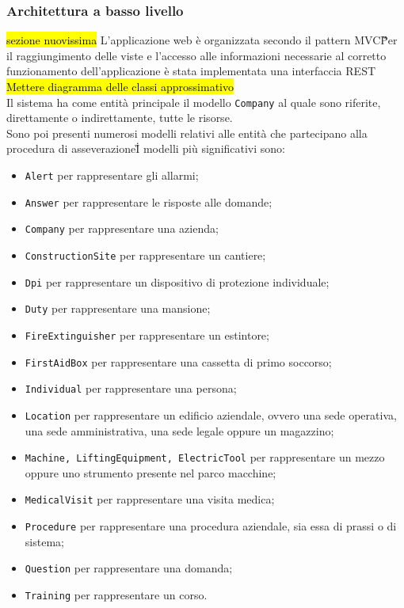 \subsubsection{Architettura a basso livello}
\hl{sezione nuovissima}
L'applicazione web è organizzata secondo il pattern \gls{MVC}\G\. Per il raggiungimento delle viste e l'accesso alle informazioni necessarie al corretto funzionamento dell'applicazione è stata implementata una interfaccia \gls{REST}\G\. \\
\hl{Mettere diagramma delle classi approssimativo}\\
Il sistema ha come entità principale il modello \texttt{Company} al quale sono riferite, direttamente o indirettamente, tutte le risorse.\\ 
Sono poi presenti numerosi modelli relativi alle entità che partecipano alla procedura di \gls{asseverazione}\G\.
I modelli più significativi sono:
\begin{itemize} 
	\item \texttt{Alert} per rappresentare gli allarmi;
	\item \texttt{Answer} per rappresentare le risposte alle domande;
	\item \texttt{Company} per rappresentare una azienda;
	\item \texttt{ConstructionSite} per rappresentare un cantiere;
	\item \texttt{Dpi} per rappresentare un dispositivo di protezione individuale;
	\item \texttt{Duty} per rappresentare una mansione;
	\item \texttt{FireExtinguisher}  per rappresentare un estintore;
	\item \texttt{FirstAidBox} per rappresentare una cassetta di primo soccorso;
	\item \texttt{Individual} per rappresentare una persona;
	\item \texttt{Location} per rappresentare un edificio aziendale, ovvero una sede operativa, una sede amministrativa, una sede legale oppure un magazzino;
	\item \texttt{Machine, LiftingEquipment, ElectricTool}  per rappresentare un mezzo oppure uno strumento presente nel parco macchine;
	\item \texttt{MedicalVisit} per rappresentare una visita medica;
	\item \texttt{Procedure} per rappresentare una procedura aziendale, sia essa di prassi o di sistema;
	\item \texttt{Question} per rappresentare una domanda;
	\item \texttt{Training} per rappresentare un corso.
\end{itemize}	
